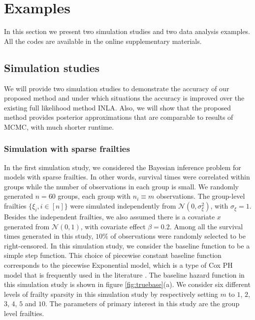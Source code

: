 \documentclass[ba]{imsart}
\begin{document}
\section{Examples}\label{sec:example}

In this section we present two simulation studies and two data analysis examples. All the codes are available in the online supplementary materials.

\subsection{Simulation studies}\label{subsec:sim}
We will provide two simulation studies to demonstrate the accuracy of our proposed method and under which situations the accuracy is improved over the existing full likelihood method INLA. Also, we will show that the proposed method provides posterior approximations that are comparable to results of MCMC, with much shorter runtime.

\subsubsection{Simulation with sparse frailties}\label{subsubsec:sim1}

In the first simulation study, we considered the Bayesian inference problem for models with sparse frailties. In other words, survival times were correlated within groups while the number of observations in each group is small. We randomly generated $n = 60$ groups, each group with $n_i \equiv m$ observations. The group-level frailties $\{\xi_i, i\in [n] \}$ were simulated independently from $\mathcal{N}(0,\sigma_\xi^{2})$, with $\sigma_{\xi} = 1$. Besides the independent frailties, we also assumed there is a covariate $x$ generated from $\mathcal{N}(0,1)$, with covariate effect $\beta = 0.2$. Among all the survival times generated in this study, $10\%$ of observations were randomly selected to be right-censored. In this simulation study, we consider the baseline function to be a simple step function. This choice of piecewise constant baseline function corresponds to the piecewise Exponential model, which is a type of Cox PH model that is frequently used in the literature \citep{piecewiseExp}.
The baseline hazard function in this simulation study is shown in figure \ref{fig:truebase}(a). We consider six different levels of frailty sparsity in this simulation study by respectively setting $m$ to $1$, $2$, $3$, $4$, $5$ and $10$. The parameters of primary interest in this study are the group level frailties.
\end{document}
